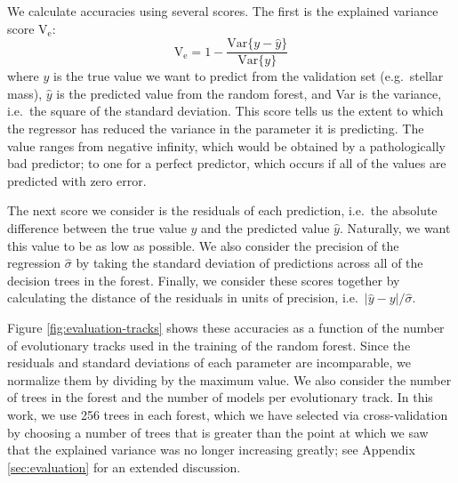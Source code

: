 \documentclass[manuscript,linenumbers]{aastex6}
\newcommand\abs[1]{\left|#1\right|}
\newif\ifref
\newcommand{\mb}[1]{\ifref\boldmath\textbf{#1}\unboldmath\else #1\fi}
\begin{document}
We calculate accuracies using several scores. The first is the explained variance score V$_{\text{e}}$:
\begin{equation}
  \text{V}_{\text{e}} = 1 - \frac{\text{Var}\{ y - \hat y \}}{\text{Var}\{ y \}}
\end{equation}
where $y$ is the \mb{true} value we want to predict from the validation set (e.g.\ stellar mass), $\hat y$ is the predicted value from the random forest, and Var is the variance, i.e.\ the square of the standard deviation. This score tells us the extent to which the regressor has reduced the variance in the parameter it is predicting. The value ranges from negative infinity, which would be obtained by a pathologically bad predictor; to one for a perfect predictor, which occurs if all of the values are predicted with zero error. 

The next score we consider is the residuals of each prediction, i.e.\ the absolute difference between the true value $y$ and the predicted value $\hat y$. Naturally, we want this value to be as low as possible. We also consider the precision of the regression $\hat \sigma$ by taking the standard deviation of predictions across all of the decision trees in the forest. Finally, we consider these scores together by calculating the distance of the residuals in units of precision, i.e.\ $\abs{\hat y - y} / \hat{\sigma}$. 

Figure \ref{fig:evaluation-tracks} shows these accuracies as a function of the number of evolutionary tracks used in the training of the random forest. Since the residuals and standard deviations of each parameter are incomparable, we normalize them by dividing by the maximum value. We also consider the number of trees in the forest and the number of models per evolutionary track\mb{. In this work, we use 256 trees in each forest, which we have selected via cross-validation by choosing a number of trees that is greater than the point at which we saw that the explained variance was no longer increasing greatly;} see Appendix \ref{sec:evaluation} for an extended discussion. 
\end{document}
